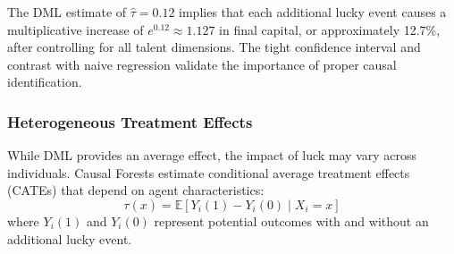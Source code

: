 The DML estimate of $\hat{\tau}= 0.12$ implies that each additional lucky
event causes a multiplicative increase of $e^{0.12}\approx 1.127$ in final
capital, or approximately 12.7\%, after controlling for all talent
dimensions. The tight confidence interval and contrast with naive regression
validate the importance of proper causal identification.

\subsubsection{Heterogeneous Treatment Effects}

While DML provides an average effect, the impact of luck may vary across
individuals. Causal Forests estimate conditional average treatment
effects (CATEs) that depend on agent characteristics:
\begin{equation}
  \tau(x) = \mathbb{E}[Y_{i}(1) - Y_{i}(0) \mid X_{i} = x]
\end{equation}
where $Y_{i}(1)$ and $Y_{i}(0)$ represent potential outcomes with and without
an additional lucky event.

